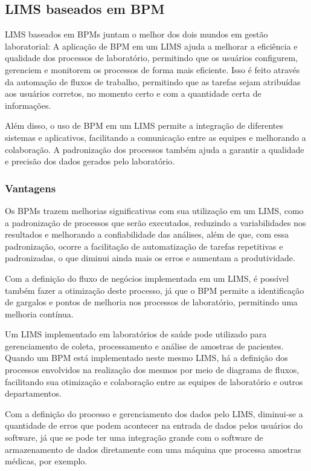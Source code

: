 \subsection{LIMS baseados em BPM}


LIMS baseados em BPMs juntam o melhor dos dois mundos em gestão laboratorial: A aplicação de BPM em um LIMS ajuda a melhorar a eficiência e qualidade dos processos de laboratório, permitindo que os usuários configurem, gerenciem e monitorem os processos de forma mais eficiente. Isso é feito através da automação de fluxos de trabalho, permitindo que as tarefas sejam atribuídas aos usuários corretos, no momento certo e com a quantidade certa de informações.

Além disso, o uso de BPM em um LIMS permite a integração de diferentes sistemas e aplicativos, facilitando a comunicação entre as equipes e melhorando a colaboração. A padronização dos processos também ajuda a garantir a qualidade e precisão dos dados gerados pelo laboratório.


\subsubsection{Vantagens}

Os BPMs trazem melhorias significativas com sua utilização em um LIMS, como a padronização de processos que serão executados, reduzindo a variabilidades nos resultados e melhorando a confiabilidade das análises, além de que, com essa padronização, ocorre a facilitação de automatização de tarefas repetitivas e padronizadas, o que diminui ainda mais os erros e aumentam a produtividade.

Com a definição do fluxo de negócios implementada em um LIMS, é possível também fazer a otimização deste processo, já que o BPM permite a identificação de gargalos e pontos de melhoria nos processos de laboratório, permitindo uma melhoria contínua.

Um LIMS implementado em laboratórios de saúde pode utilizado para gerenciamento de coleta, processamento e análise de amostras de pacientes. Quando um BPM está implementado neste mesmo LIMS, há a definição dos processos envolvidos na realização dos mesmos por meio de diagrama de fluxos, facilitando sua otimização e colaboração entre as equipes de laboratório e outros departamentos.

Com a definição do processo e gerenciamento dos dados pelo LIMS, diminui-se a quantidade de erros que podem acontecer na entrada de dados pelos usuários do software, já que se pode ter uma integração grande com o software de armazenamento de dados diretamente com uma máquina que processa amostras médicas, por exemplo.

